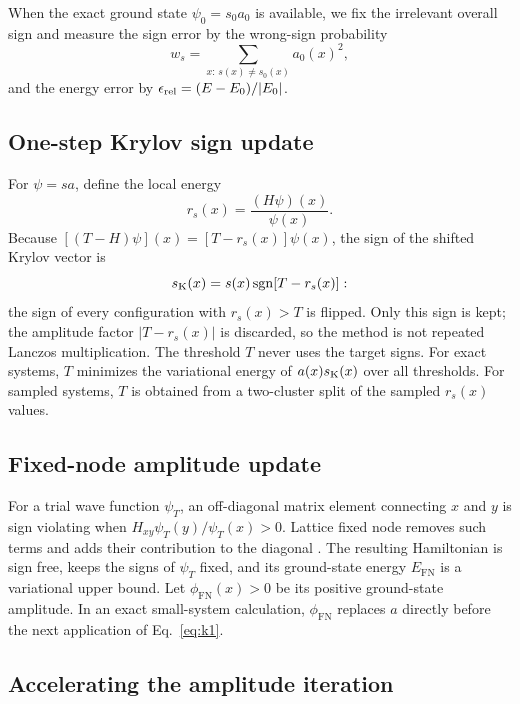 \documentclass[aps,prb,reprint,onecolumn,superscriptaddress,floatfix]{revtex4-2}
\newcommand{\FN}{\mathrm{FN}}
\begin{document}
When the exact ground state $\psi_0=s_0a_0$ is available, we fix the
irrelevant overall sign and measure the sign error by the wrong-sign
probability
\begin{equation}
w_s=\sum_{x:\,s(x)\neq s_0(x)} a_0(x)^2 ,
\label{eq:signweight}
\end{equation}
and the energy error by $\epsilon_{\rm rel}=(E-E_0)/|E_0|$.

\subsection{One-step Krylov sign update}

For $\psi=sa$, define the local energy
\begin{equation}
r_s(x)=\frac{(H\psi)(x)}{\psi(x)} .
\label{eq:localenergy}
\end{equation}
Because $[(T-H)\psi](x)=[T-r_s(x)]\psi(x)$, the sign of the shifted Krylov
vector is
\begin{equation}
s_{\rm K}(x)=s(x)\operatorname{sgn}[T-r_s(x)] :
\label{eq:k1}
\end{equation}
the sign of every configuration with $r_s(x)>T$ is flipped. Only this sign
is kept; the amplitude factor $|T-r_s(x)|$ is discarded, so the method is not
repeated Lanczos multiplication. The threshold $T$ never uses the target
signs. For exact systems, $T$ minimizes the variational energy of
$a(x)s_{\rm K}(x)$ over all thresholds. For sampled systems, $T$ is obtained
from a two-cluster split of the sampled $r_s(x)$ values.

\subsection{Fixed-node amplitude update}

For a trial wave function $\psi_T$, an off-diagonal matrix element connecting
$x$ and $y$ is sign violating when $H_{xy}\psi_T(y)/\psi_T(x)>0$. Lattice
fixed node removes such terms and adds their contribution to the diagonal
\cite{vanBemmel1994}. The resulting Hamiltonian is sign free, keeps the
signs of $\psi_T$ fixed, and its ground-state energy $E_\FN$ is a variational
upper bound. Let $\phi_\FN(x)>0$ be its positive ground-state amplitude. In an
exact small-system calculation, $\phi_\FN$ replaces $a$ directly before the
next application of Eq.~\eqref{eq:k1}.

\subsection{Accelerating the amplitude iteration}
\end{document}
